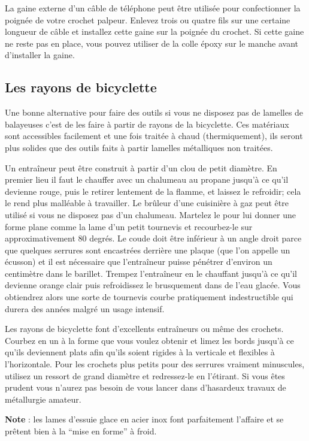 \documentclass[a4paper,french,11pt,twoside]{report}
\begin{document}
La gaine externe d'un câble de téléphone peut être utilisée pour confectionner la poignée de votre crochet palpeur. Enlevez trois ou quatre fils sur une certaine longueur de câble et installez cette gaine sur la poignée du crochet. Si cette gaine ne reste pas en place, vous pouvez utiliser de la colle époxy sur le manche avant d'installer la gaine.

\subsection{Les rayons de bicyclette}

Une bonne alternative pour faire des outils si vous ne disposez pas de lamelles de balayeuses c'est de les faire à partir de rayons de la bicyclette. Ces matériaux sont accessibles facilement et une fois traitée à chaud (thermiquement), ils seront plus solides que des outils faits à partir lamelles métalliques non traitées.

Un entraîneur peut être construit à partir d'un clou de petit diamètre. En premier lieu il faut le chauffer avec un chalumeau au propane jusqu'à ce qu'il devienne rouge, puis le retirer lentement de la flamme, et laissez le refroidir; cela le rend plus malléable à travailler. Le brûleur d'une cuisinière à gaz peut être utilisé si vous ne disposez pas d'un chalumeau. Martelez le pour lui donner une forme plane comme la lame d'un petit tournevis et recourbez-le sur approximativement 80 degrés. Le coude doit être inférieur à un angle droit parce que quelques serrures sont encastrées derrière une plaque (que l'on appelle un écusson) et il est nécessaire que l'entraîneur puisse pénétrer d'environ un centimètre dans le barillet. Trempez l'entraîneur en le chauffant jusqu'à ce qu'il devienne orange clair puis refroidissez le brusquement dans de l'eau glacée. Vous obtiendrez alors une sorte de tournevis courbe pratiquement indestructible qui durera des années malgré un usage intensif.

Les rayons de bicyclette font d'excellents entraîneurs ou même des crochets. Courbez en un à la forme que vous voulez obtenir et limez les bords jusqu'à ce qu'ils deviennent plats afin qu'ils soient rigides à la verticale et flexibles à l'horizontale. Pour les crochets plus petits pour des serrures vraiment minuscules, utilisez un ressort de grand diamètre et redressez-le en l'étirant. Si vous êtes prudent vous n'aurez pas besoin de vous lancer dans d'hasardeux travaux de métallurgie amateur.

\medskip
\noindent \textbf{Note} : les lames d'essuie glace en acier inox font parfaitement l'affaire et se prêtent bien à la \enquote{mise en forme} à froid.
\end{document}
